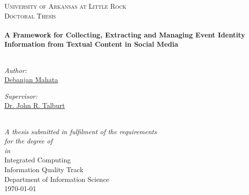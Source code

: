 \documentclass[11pt, oneside]{Thesis} %
\begin{document}
\begin{titlepage}
\begin{center}

\textsc{\LARGE University of Arkansas at Little Rock}\\[1.5cm] %
\textsc{\Large Doctoral Thesis}\\[0.5cm] %

\HRule \\[0.4cm] %
{\huge \bfseries A Framework for Collecting, Extracting and Managing Event Identity Information from Textual Content in Social Media}\\[0.4cm] %
\HRule \\[1.5cm] %
 
\begin{minipage}{0.4\textwidth}
\begin{flushleft} \large
\emph{Author:}\\
\href{https://sites.google.com/a/ualr.edu/debanjan-mahata/home}{Debanjan Mahata} %
\end{flushleft}
\end{minipage}
\begin{minipage}{0.4\textwidth}
\begin{flushright} \large
\emph{Supervisor:} \\
\href{http://ualr.edu/technologyinnovation/faculty/john-talburt/}{Dr. John R. Talburt} %
\end{flushright}
\end{minipage}\\[3cm]
 
\large \textit{A thesis submitted in fulfilment of the requirements\\ for the degree of \degreename}\\[0.3cm] %
\textit{in}\\[0.4cm]
Integrated Computing \\ Information Quality Track \\ Department of Information Science \\[2cm] %
 
{\large \today}\\[4cm] %
 
\vfill
\end{center}

\end{titlepage}
\end{document}
